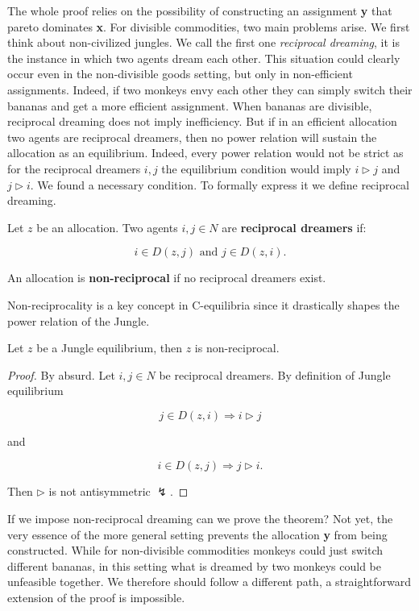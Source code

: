 The whole proof relies on the possibility of constructing an assignment \textbf{y} that pareto dominates \textbf{x}. For divisible commodities, two main problems arise. We first think about non-civilized jungles. We call the first one \textit{reciprocal dreaming}, it is the instance in which two agents dream each other. This situation could clearly occur even in the non-divisible goods setting, but only in non-efficient assignments. Indeed, if two monkeys envy each other they can simply switch their bananas and get a more efficient assignment. When bananas are divisible, reciprocal dreaming does not imply inefficiency. But if in an efficient allocation two agents are reciprocal dreamers, then no power relation will sustain the allocation as an equilibrium. Indeed, every power relation would not be strict as for the reciprocal dreamers $i,j$ the equilibrium condition would imply $i\triangleright j$ and $j\triangleright i$. We found a necessary condition. To formally express it we define reciprocal dreaming.

\begin{definition}\label{Def: reciprocal dreaming}
    Let $z$ be an allocation. Two agents $i,j\in N$ are \textbf{reciprocal dreamers} if:

    \[i \in D(z,j) \text{ and } j \in D(z,i).\]

    An allocation is \textbf{non-reciprocal} if no reciprocal dreamers exist. 
\end{definition}

Non-reciprocality is a key concept in C-equilibria since it drastically shapes the power relation of the Jungle. 


\begin{proposition}\label{Jungle implies no reciprocality}
    Let $z$ be a Jungle equilibrium, then $z$ is non-reciprocal.

    \begin{proof}
        By absurd. Let $i,j\in N$ be reciprocal dreamers. By definition of Jungle equilibrium

        \[j\in D(z,i)\Rightarrow i\triangleright j\]

        and 

        \[i \in D(z,j) \Rightarrow j\triangleright i.\]

        Then $\triangleright$ is not antisymmetric $\lightning$. 
    \end{proof}
\end{proposition}

If we impose non-reciprocal dreaming can we prove the theorem? Not yet, the very essence of the more general setting prevents the allocation \textbf{y} from being constructed. While for non-divisible commodities monkeys could just switch different bananas, in this setting what is dreamed by two monkeys could be unfeasible together. We therefore should follow a different path, a straightforward extension of the proof is impossible.

